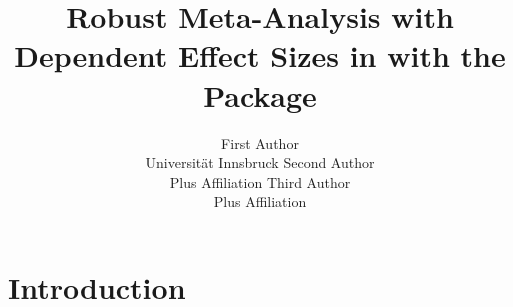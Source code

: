 \documentclass[article]{jss}
\author{First Author\\Universit\"at Innsbruck \And 
        Second Author\\Plus Affiliation \And
        Third Author\\Plus Affiliation
      }
\title{Robust Meta-Analysis with Dependent Effect Sizes in \proglang{R} with the \pkg{robustmeta} Package}
\begin{document}

\section[Introduction]{Introduction}
\end{document}
